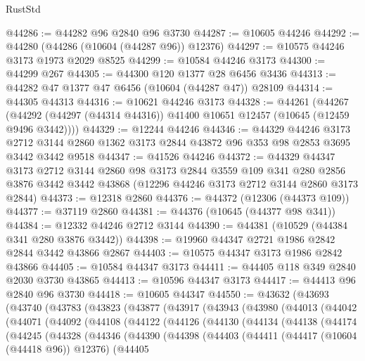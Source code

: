 \begin{lexlean}{RustStd}
\begin{coremodule}
@44286 := @44282 @96 @2840 @96 @3730
@44287 := @10605 @44246
@44292 := @44280 (@44286 (@10604 (@44287 @96)) @12376)
@44297 := @10575 @44246 @3173 @1973 @2029 @8525
@44299 := @10584 @44246 @3173
@44300 := @44299 @267
@44305 := @44300 @120 @1377 @28 @6456 @3436
@44313 := @44282 @47 @1377 @47 @6456 (@10604 (@44287 @47)) @28109
@44314 := @44305 @44313
@44316 := @10621 @44246 @3173
@44328 := @44261
    (@44267 (@44292 (@44297 (@44314 @44316)) @41400 @10651 @12457 (@10645 (@12459 @9496 @3442))))
@44329 := @12244 @44246
@44346 := @44329
    @44246
    @3173
    @2712
    @3144
    @2860
    @1362
    @3173
    @2844
    @43872
    @96
    @353
    @98
    @2853
    @3695
    @3442
    @3442
    @9518
@44347 := @41526 @44246
@44372 := @44329
    @44347
    @3173
    @2712
    @3144
    @2860
    @98
    @3173
    @2844
    @3559
    @109
    @341
    @280
    @2856
    @3876
    @3442
    @3442
    @43868
    (@12296 @44246 @3173 @2712 @3144 @2860 @3173 @2844)
@44373 := @12318 @2860
@44376 := @44372 (@12306 (@44373 @109))
@44377 := @37119 @2860
@44381 := @44376 (@10645 (@44377 @98 @341))
@44384 := @12332 @44246 @2712 @3144
@44390 := @44381 (@10529 (@44384 @341 @280 @3876 @3442))
@44398 := @19960 @44347 @2721 @1986 @2842 @2844 @3442 @43866 @2867
@44403 := @10575 @44347 @3173 @1986 @2842 @43866
@44405 := @10584 @44347 @3173
@44411 := @44405 @118 @349 @2840 @2030 @3730 @43865
@44413 := @10596 @44347 @3173
@44417 := @44413 @96 @2840 @96 @3730
@44418 := @10605 @44347
@44550 := @43632
    (@43693
      (@43740
        (@43783
          (@43823
            (@43877
              (@43917
                (@43943
                  (@43980
                    (@44013
                      (@44042
                        (@44071
                          (@44092
                            (@44108
                              (@44122
                                (@44126
                                  (@44130
                                    (@44134
                                      (@44138
                                        (@44174
                                          (@44245
                                            (@44328
                                              (@44346
                                                (@44390
                                                  (@44398
                                                    (@44403
                                                      (@44411
                                                        (@44417 (@10604 (@44418 @96)) @12376)
                                                        (@44405

\end{coremodule}
\end{lexlean}

